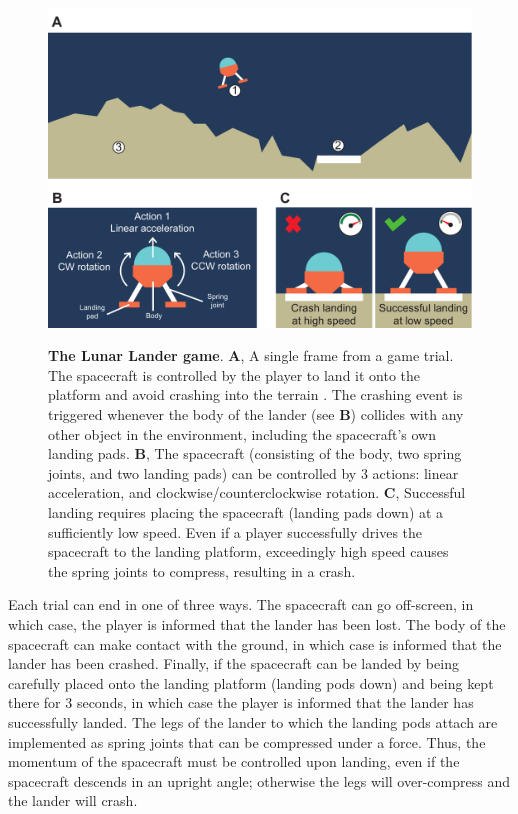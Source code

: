 \begin{figure}[bth]
    \centering
    {\includegraphics[width=\linewidth]{Figures/c5/ll_ss.pdf}}
    \caption[]{\textbf{The Lunar Lander game}. \textbf{A}, A single frame from a game trial. The spacecraft  is controlled by the player to land it onto the platform  and avoid crashing into the terrain . The crashing event is triggered whenever the body of the lander (see \textbf{B}) collides with any other object in the environment, including the spacecraft's own landing pads. \textbf{B}, The spacecraft (consisting of the body, two spring joints, and two landing pads) can be controlled by 3 actions: linear acceleration, and clockwise/counterclockwise rotation. \textbf{C}, Successful landing requires placing the spacecraft (landing pads down) at a sufficiently low speed. Even if a player successfully drives the spacecraft to the landing platform, exceedingly high speed causes the spring joints to compress, resulting in a crash.}\label{fig:5-ll_ss}
\end{figure}

Each trial can end in one of three ways. The spacecraft can go off-screen, in which case, the player is informed that the lander has been lost. The body of the spacecraft can make contact with the ground, in which case is informed that the lander has been crashed. Finally, if the spacecraft can be landed by being carefully placed onto the landing platform (landing pods down) and being kept there for 3 seconds, in which case the player is informed that the lander has successfully landed. The legs of the lander to which the landing pods attach are implemented as spring joints that can be compressed under a force. Thus, the momentum of the spacecraft must be controlled upon landing, even if the spacecraft descends in an upright angle; otherwise the legs will over-compress and the lander will crash.

